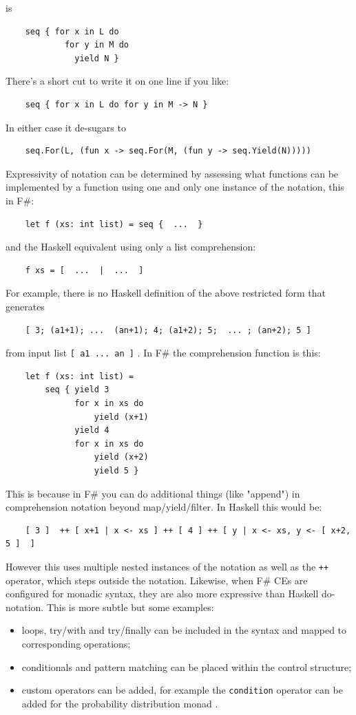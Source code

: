 \documentclass[acmsmall]{acmart}\settopmatter{}
\begin{document}
is
\begin{verbatim}
    seq { for x in L do 
            for y in M do 
              yield N }
\end{verbatim}
There’s a short cut to write it on one line if you like:
\begin{verbatim}
    seq { for x in L do for y in M -> N }
\end{verbatim}
In either case it de-sugars to
\begin{verbatim}
    seq.For(L, (fun x -> seq.For(M, (fun y -> seq.Yield(N)))))
\end{verbatim}
Expressivity of notation can be determined by assessing what functions can be implemented by a function using one and only
one instance of the notation, this in F\#:
\begin{verbatim}
    let f (xs: int list) = seq {  ...  }
\end{verbatim}
and the Haskell equivalent using only a list comprehension:
\begin{verbatim}
    f xs = [  ...  |  ...  ]
\end{verbatim}
For example, there is no Haskell definition of the above restricted form that generates
\begin{verbatim}
    [ 3; (a1+1); ...  (an+1); 4; (a1+2); 5;  ... ; (an+2); 5 ]
\end{verbatim}
from input list \texttt{[ a1 ... an ]} . In F\# the comprehension function is this:
\begin{verbatim}
    let f (xs: int list) =
        seq { yield 3
              for x in xs do 
                  yield (x+1)
              yield 4 
              for x in xs do
                  yield (x+2)
                  yield 5 }
\end{verbatim}
This is because in F\# you can do additional things (like "append") in comprehension notation beyond map/yield/filter.
In Haskell this would be:
\begin{verbatim}
    [ 3 ]  ++ [ x+1 | x <- xs ] ++ [ 4 ] ++ [ y | x <- xs, y <- [ x+2, 5 ]  ]
\end{verbatim}
However this uses multiple nested instances of the notation as well as the \texttt{++} operator, which steps outside the notation.
Likewise, when F\# CEs are configured for monadic syntax, they are also more expressive than Haskell do-notation.   This is more subtle but some examples:
\begin{itemize}
\item loops, try/with and try/finally can be included in the syntax and mapped to corresponding operations;

\item conditionals and pattern matching can be placed within the control structure;

\item custom operators can be added, for example the \texttt{condition} operator can be added for the probability distribution monad \citep{syme2015expert}.
\end{itemize}
\end{document}
